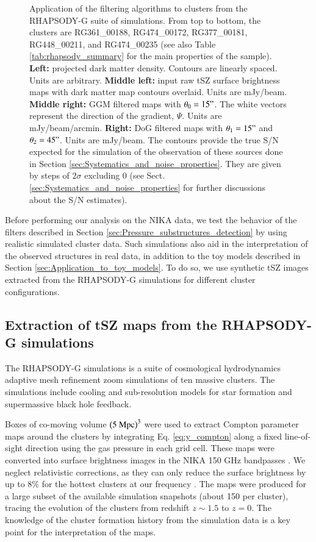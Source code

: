 \documentclass[traditabstract]{aa}
\begin{document}
\begin{figure}[h]
\caption{\footnotesize{Application of the filtering algorithms to clusters from the RHAPSODY-G suite of simulations. From top to bottom, the clusters are RG361\_00188, RG474\_00172, RG377\_00181, RG448\_00211, and RG474\_00235 (see also Table \ref{tab:rhapsody_summary} for the main properties of the sample). {\bf Left:} projected dark matter density. Contours are linearly spaced. Units are arbitrary. {\bf Middle left:} input raw tSZ surface brightness maps with dark matter map contours overlaid. Units are mJy/beam. {\bf Middle right:} GGM filtered maps with $\theta_0 = 15"$. The white vectors represent the direction of the gradient, $\Psi$. Units are mJy/beam/arcmin. {\bf Right:} DoG filtered maps with $\theta_1 = 15"$ and $\theta_2 = 45"$. Units are mJy/beam. The contours provide the true S/N expected for the simulation of the observation of these sources done in Section \ref{sec:Systematics_and_noise_properties}. They are given by steps of $2 \sigma$ excluding 0 (see Sect. \ref{sec:Systematics_and_noise_properties} for further discussions about the S/N estimates).}}
\label{fig:RG_cluster_sample}
\end{figure}

Before performing our analysis on the NIKA data, we test the behavior of the filters described in Section \ref{sec:Pressure_substructures_detection} by using realistic simulated cluster data. Such simulations also aid in the interpretation of the observed structures in real data, in addition to the toy models described in Section \ref{sec:Application_to_toy_models}. To do so, we use synthetic tSZ images extracted from the RHAPSODY-G simulations for different cluster configurations.

\subsection{Extraction of tSZ maps from the RHAPSODY-G simulations}
The RHAPSODY-G simulations \citep{Wu2013,Hahn2017} is a suite of cosmological hydrodynamics adaptive mesh refinement zoom simulations of ten massive clusters. The simulations include cooling and sub-resolution models for star formation and supermassive black hole feedback. 

Boxes of co-moving volume $\left(5 \ {\rm Mpc}\right)^3$ were used to extract Compton parameter maps around the clusters by integrating Eq. \ref{eq:y_compton} along a fixed line-of-sight direction using the gas pressure in each grid cell. These maps were converted into surface brightness images in the NIKA 150 GHz bandpasses \citep[see the coefficient provided in][]{Adam2016b}. We neglect relativistic corrections, as they can only reduce the surface brightness by up to 8\% for the hottest clusters at our frequency \citep{Itoh2003}. The maps were produced for a large subset of the available simulation snapshots (about 150 per cluster), tracing the evolution of the clusters from redshift $z \sim 1.5$ to $z=0$. The knowledge of the cluster formation history from the simulation data is a key point for the interpretation of the maps.
\end{document}

